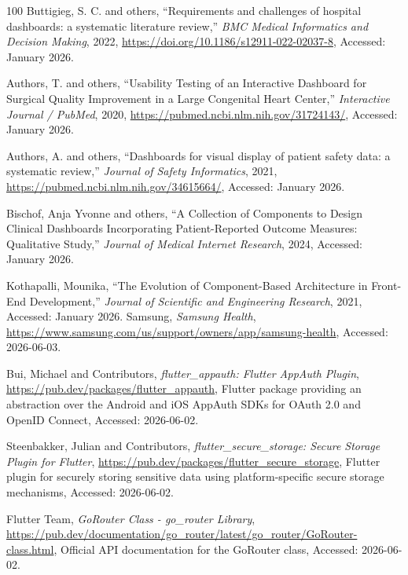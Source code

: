 \begin{thebibliography}{100}
 Buttigieg, S. C. and others, ``Requirements and challenges of hospital dashboards: a systematic literature review,'' \textit{BMC Medical Informatics and Decision Making}, 2022, \url{https://doi.org/10.1186/s12911-022-02037-8}, Accessed: January 2026.

 Authors, T. and others, ``Usability Testing of an Interactive Dashboard for Surgical Quality Improvement in a Large Congenital Heart Center,'' \textit{Interactive Journal / PubMed}, 2020, \url{https://pubmed.ncbi.nlm.nih.gov/31724143/}, Accessed: January 2026.

 Authors, A. and others, ``Dashboards for visual display of patient safety data: a systematic review,'' \textit{Journal of Safety Informatics}, 2021, \url{https://pubmed.ncbi.nlm.nih.gov/34615664/}, Accessed: January 2026.

 Bischof, Anja Yvonne and others, ``A Collection of Components to Design Clinical Dashboards Incorporating Patient-Reported Outcome Measures: Qualitative Study,'' \textit{Journal of Medical Internet Research}, 2024, Accessed: January 2026.


 Kothapalli, Mounika, ``The Evolution of Component-Based Architecture in Front-End Development,'' \textit{Journal of Scientific and Engineering Research}, 2021, Accessed: January 2026.
Samsung,
\textit{Samsung Health},
\url{https://www.samsung.com/us/support/owners/app/samsung-health},
Accessed: 2026-06-03.

Bui, Michael and Contributors,
\textit{flutter\_appauth: Flutter AppAuth Plugin},
\url{https://pub.dev/packages/flutter_appauth},
Flutter package providing an abstraction over the Android and iOS AppAuth SDKs for OAuth 2.0 and OpenID Connect,
Accessed: 2026-06-02.

Steenbakker, Julian and Contributors,
\textit{flutter\_secure\_storage: Secure Storage Plugin for Flutter},
\url{https://pub.dev/packages/flutter_secure_storage},
Flutter plugin for securely storing sensitive data using platform-specific secure storage mechanisms,
Accessed: 2026-06-02.

Flutter Team,
\textit{GoRouter Class - go\_router Library},
\url{https://pub.dev/documentation/go_router/latest/go_router/GoRouter-class.html},
Official API documentation for the GoRouter class,
Accessed: 2026-06-02.


\end{thebibliography}
